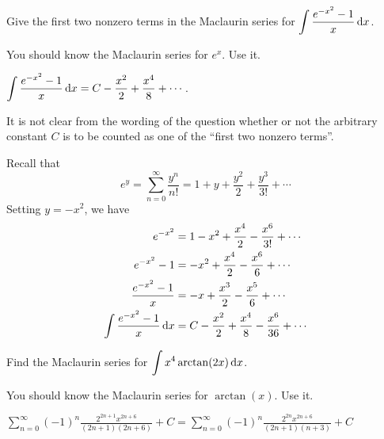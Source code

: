 \begin{Mquestion}[2014D]
Give the first two nonzero terms in the Maclaurin series for $\displaystyle{\int \frac{e^{-x^2}-1}{x} \,\mathrm{d}x}$.
\end{Mquestion}

\begin{hint}
You should know the Maclaurin series for $e^x$. Use it.
\end{hint}

\begin{answer}
$\displaystyle\int \frac{e^{-x^2}-1}{x} \,\mathrm{d}x = C -\frac{x^2}{2} + \frac{x^4}{8} + \cdots$.


It is not clear from the wording of the question whether or not
the arbitrary constant $C$ is to be counted as one of the
``first two nonzero terms''.
\end{answer}

\begin{solution}
Recall that
\begin{equation*}
e^y = \sum_{n=0}^\infty\frac{y^n}{n!}
    =1 + y + \frac{y^2}{2} +\frac{y^3}{3!} + \cdots
\end{equation*}
Setting $y=-x^2$, we have
\begin{align*}
e^{-x^2} & = 1 -x^2 + \frac{x^4}{2} - \frac{x^6}{3!} + \cdots \\
e^{-x^2} - 1& =  -x^2 + \frac{x^4}{2} - \frac{x^6}{6} + \cdots \\
\frac{e^{-x^2} - 1}{x}& =  -x + \frac{x^3}{2} - \frac{x^5}{6} + \cdots \\
\int \frac{e^{-x^2}-1}{x} \,\mathrm{d}x& = C -\frac{x^2}{2} + \frac{x^4}{8} - \frac{x^6}{36} + \cdots \\
\end{align*}
\end{solution}




\begin{question}[2015A]
Find the Maclaurin series for $\displaystyle{\int x^4\arctan(2x) \,\mathrm{d}x}$.
\end{question}

\begin{hint}
You should know the Maclaurin series for $\arctan(x)$. Use it.
\end{hint}

\begin{answer}
$\displaystyle\sum\limits_{n=0}^\infty (-1)^n\frac{2^{2n+1} x^{2n+6}}{(2n+1)(2n+6)} +C
=\sum\limits_{n=0}^\infty (-1)^n\frac{2^{2n} x^{2n+6}}{(2n+1)(n+3)} +C$
\end{answer}

